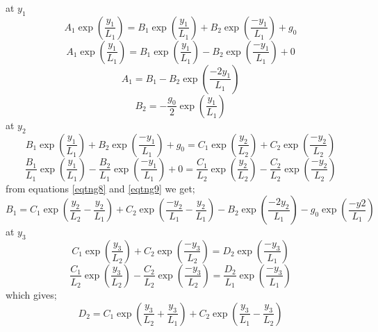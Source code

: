 at $y_1$
\begin{equation} \label{eqtng5}
 A_1\exp \left(\frac{y_1}{L_1}\right) =  B_1\exp \left(\frac{y_1}{L_1}\right) + B_2\exp \left(\frac{-y_1}{L_1}\right) + g_0
\end{equation}
\begin{equation} \label{eqtng6}
 A_1\exp \left(\frac{y_1}{L_1}\right) =  B_1\exp \left(\frac{y_1}{L_1}\right) - B_2\exp \left(\frac{-y_1}{L_1}\right) + 0
\end{equation}
\begin{equation}\label{eqtng7}
A_1 = B_1 - B_2\exp \left( \frac{-2y_1}{L_1}\right)
\end{equation}
\begin{equation}
B_2 = -\frac{g_0}{2}\exp \left( \frac{y_1}{L_1}\right)
\end{equation}
at $y_2$
\begin{equation} \label{eqtng8}
B_1\exp \left(\frac{y_1}{L_1}\right) + B_2\exp \left(\frac{-y_1}{L_1}\right) + g_0 = C_1\exp \left(\frac{y_2}{L_2}\right) + C_2\exp \left(\frac{-y_2}{L_2}\right)
\end{equation}
\begin{equation} \label{eqtng9}
\frac{B_1}{L_1}\exp \left(\frac{y_1}{L_1}\right) - \frac{B_2}{L_1}\exp \left(\frac{-y_1}{L_1}\right) + 0 = \frac{C_1}{L_2}\exp \left(\frac{y_2}{L_2}\right) - \frac{C_2}{L_2}\exp \left(\frac{-y_2}{L_2}\right)
\end{equation}
from equations \ref{eqtng8} and \ref{eqtng9} we get;
\begin{equation} \label{eqtng10}
B_1 = C_1\exp \left(\frac{y_2}{L_2} -\frac{y_2}{L_1}\right) + C_2\exp \left(\frac{-y_2}{L_1} -\frac{y_2}{L_1}\right) - B_2\exp \left(\frac{-2y_2}{L_1}\right) -g_0\exp \left(\frac{-y2}{L_1}\right)
\end{equation}
at $y_3$
\begin{equation} \label{eqtng11}
C_1\exp \left(\frac{y_3}{L_2}\right) + C_2\exp \left(\frac{-y_3}{L_2}\right)  =  D_2\exp \left(\frac{-y_3}{L_1}\right)
\end{equation}
\begin{equation} \label{eqtng12}
\frac{C_1}{L_2}\exp \left(\frac{y_3}{L_2}\right) - \frac{C_2}{L_2}\exp \left(\frac{-y_3}{L_2}\right)= \frac{D_2}{L_1}\exp \left(\frac{-y_3}{L_1}\right) 
\end{equation}
which gives;
\begin{equation}\label{eqtng13}
D_2 = C_1\exp \left( \frac{y_3}{L_2}+\frac{y_3}{L_1}\right) + C_2\exp \left( \frac{y_3}{L_1}-\frac{y_3}{L_2}\right)
\end{equation}

